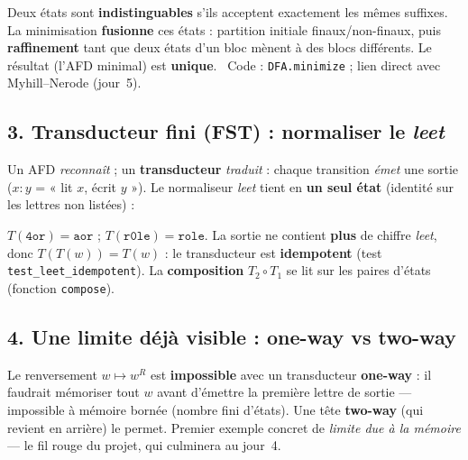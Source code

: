 \documentclass[11pt,a4paper]{scrartcl}
\begin{document}
\begin{notion}
Deux états sont \textbf{indistinguables} s'ils acceptent exactement les mêmes suffixes.
La minimisation \textbf{fusionne} ces états : partition initiale finaux/non-finaux, puis
\textbf{raffinement} tant que deux états d'un bloc mènent à des blocs différents. Le
résultat (l'AFD minimal) est \textbf{unique}. \textbullet\ Code : \texttt{DFA.minimize} ;
lien direct avec Myhill--Nerode (jour~5).
\end{notion}

\subsection*{3. Transducteur fini (FST) : normaliser le \emph{leet}}
Un AFD \emph{reconnaît} ; un \textbf{transducteur} \emph{traduit} : chaque transition
\emph{émet} une sortie ($x\!:\!y$ = « lit $x$, écrit $y$ »). Le normaliseur \emph{leet}
tient en \textbf{un seul état} (identité sur les lettres non listées) :

\begin{center}
\end{center}

\begin{exemple}
$T(\texttt{4or})=\texttt{aor}$ ; $T(\texttt{r0le})=\texttt{role}$. La sortie ne contient
\textbf{plus} de chiffre \emph{leet}, donc $T(T(w))=T(w)$ : le transducteur est
\textbf{idempotent} (test \texttt{test\_leet\_idempotent}). La \textbf{composition}
$T_2\circ T_1$ se lit sur les paires d'états (fonction \texttt{compose}).
\end{exemple}

\subsection*{4. Une limite déjà visible : one-way vs two-way}
Le renversement $w\mapsto w^{R}$ est \textbf{impossible} avec un transducteur
\textbf{one-way} : il faudrait mémoriser tout $w$ avant d'émettre la première lettre de
sortie — impossible à mémoire bornée (nombre fini d'états). Une tête \textbf{two-way}
(qui revient en arrière) le permet. Premier exemple concret de \emph{limite due à la mémoire}
— le fil rouge du projet, qui culminera au jour~4.
\end{document}

